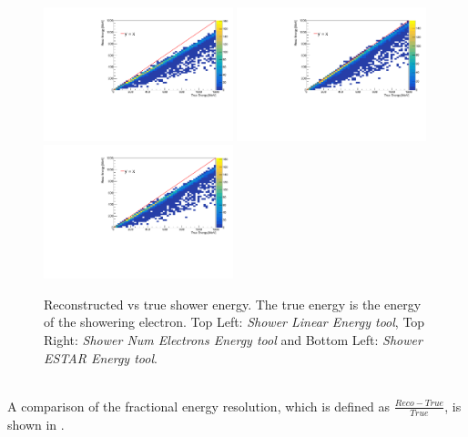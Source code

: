 \begin{figure}[h!]
    \centering
    \includegraphics[width = 0.49\textwidth]{figures-chap4/true_vs_reco_showeringE_linear.pdf}
    \includegraphics[width = 0.49\textwidth]{figures-chap4/true_vs_reco_showeringE_oldmethod.pdf}
    \includegraphics[width = 0.49\textwidth]{figures-chap4/true_vs_reco_showeringE_ESTAR.pdf}
    \captionsetup{width=0.45\textwidth}
    \parbox[b]{0.49\textwidth}%
  {
    \caption[Reconstructed vs true shower energy. The true energy is the energy of the showering electron.]
    {Reconstructed vs true shower energy. The true energy is the energy of the showering electron. Top Left: \textit{Shower Linear Energy tool}, Top Right: \textit{Shower Num Electrons Energy tool} and Bottom Left: \textit{Shower ESTAR Energy tool}. \\\\}
    \label{fig:reco_vs_true_showeringE}}
\end{figure}

A comparison of the fractional energy resolution, which is defined as $\frac{Reco - True}{True}$, is shown in .

